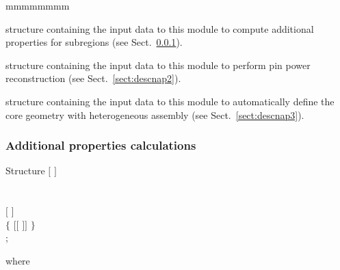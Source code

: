 \begin{ListeDeDescription}{mmmmmmmm}
\item[\dstr{descnap1}] structure containing the input data to this module to compute additional properties for subregions
(see Sect.~\ref{sect:descnap1}).

\item[\dstr{descnap2}] structure containing the input data to this module to perform pin power reconstruction
(see Sect.~\ref{sect:descnap2}).

\item[\dstr{descnap3}] structure containing the input data to this module to automatically define the core geometry with heterogeneous assembly
(see Sect.~\ref{sect:descnap3}).

\end{ListeDeDescription}

\subsubsection{Additional properties calculations}\label{sect:descnap1}

\begin{DataStructure}{Structure }
$[$   $]$ \\
\\
   \\
$[$   $]$ \\
$\{$ $[[$    $]]$ $\}$ \\
;
\end{DataStructure}

\noindent where

